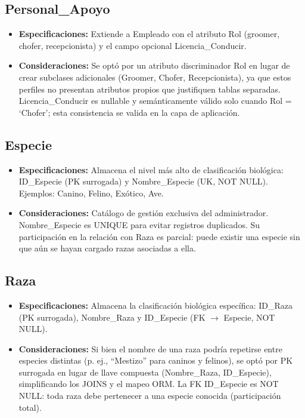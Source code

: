 \subsection{Personal\_Apoyo}

\begin{itemize}
	\item \textbf{Especificaciones:} Extiende a Empleado con el atributo Rol (groomer, chofer, recepcionista) y el campo opcional Licencia\_Conducir.
	\item \textbf{Consideraciones:} Se optó por un atributo discriminador Rol en lugar de crear subclases adicionales (Groomer, Chofer, Recepcionista), ya que estos perfiles no presentan atributos propios que justifiquen tablas separadas. Licencia\_Conducir es nullable y semánticamente válido solo cuando Rol = `Chofer'; esta consistencia se valida en la capa de aplicación.
\end{itemize}

\subsection{Especie}

\begin{itemize}
	\item \textbf{Especificaciones:} Almacena el nivel más alto de clasificación biológica: ID\_Especie (PK surrogada) y Nombre\_Especie (UK, NOT NULL). Ejemplos: Canino, Felino, Exótico, Ave.
	\item \textbf{Consideraciones:} Catálogo de gestión exclusiva del administrador. Nombre\_Especie es UNIQUE para evitar registros duplicados. Su participación en la relación con Raza es parcial: puede existir una especie sin que aún se hayan cargado razas asociadas a ella.
\end{itemize}

\subsection{Raza}

\begin{itemize}
	\item \textbf{Especificaciones:} Almacena la clasificación biológica específica: ID\_Raza (PK surrogada), Nombre\_Raza y ID\_Especie (FK $\rightarrow$ Especie, NOT NULL).
	\item \textbf{Consideraciones:} Si bien el nombre de una raza podría repetirse entre especies distintas (p. ej., ``Mestizo'' para caninos y felinos), se optó por PK surrogada en lugar de llave compuesta (Nombre\_Raza, ID\_Especie), simplificando los JOINS y el mapeo ORM. La FK ID\_Especie es NOT NULL: toda raza debe pertenecer a una especie conocida (participación total).
\end{itemize}

